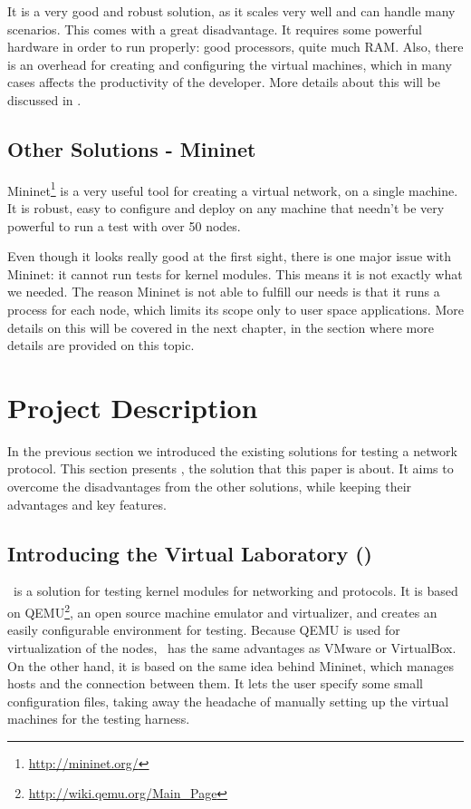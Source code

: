 It is a very good and robust solution, as it scales very well and can handle many scenarios.
This comes with a great disadvantage.
It requires some powerful hardware in order to run properly: good processors, quite much RAM.
Also, there is an overhead for creating and configuring the virtual machines, which in many cases affects the productivity of the developer.
More details about this will be discussed in .

\subsection{Other Solutions - Mininet}
\label{sub-sec:proto-testing-mininet}

Mininet\footnote{\url{http://mininet.org/}} is a very useful tool for creating a virtual network, on a single machine.
It is robust, easy to configure and deploy on any machine that needn't be very powerful to run a test with over 50 nodes.

Even though it looks really good at the first sight, there is one major issue with Mininet: it cannot run tests for kernel modules.
This means it is not exactly what we needed.
The reason Mininet is not able to fulfill our needs is that it runs a process for each node, which limits its scope only to user space applications.
More details on this will be covered in the next chapter, in the section  where more details are provided on this topic.

\section{Project Description}
\label{sec:proj-desc}

In the previous section we introduced the existing solutions for testing a network protocol.
This section presents \project, the solution that this paper is about.
It aims to overcome the disadvantages from the other solutions, while keeping their advantages and key features.

\subsection{Introducing the Virtual Laboratory (\project)}
\label{sub-sec:proj-desc-intro}

\project\ is a solution for testing kernel modules for networking and protocols.
It is based on QEMU\footnote{\url{http://wiki.qemu.org/Main_Page}}, an open source machine emulator and virtualizer, and creates an easily configurable environment for testing.
Because QEMU is used for virtualization of the nodes, \project\ has the same advantages as VMware or VirtualBox.
On the other hand, it is based on the same idea behind Mininet, which manages hosts and the connection between them.
It lets the user specify some small configuration files, taking away the headache of manually setting up the virtual machines for the testing harness.


